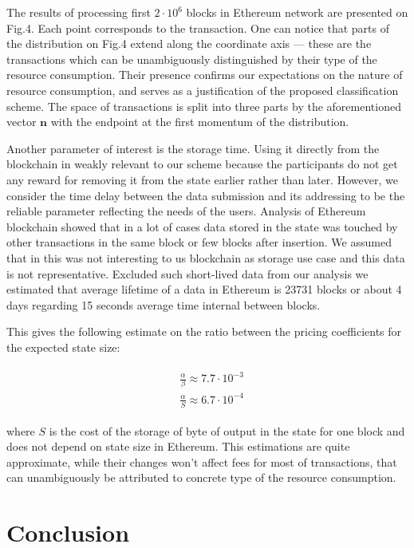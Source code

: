 \documentclass[]{llncs}   %
\newcommand{\authnote}[2]{\marginpar{\parbox{\marginparwidth}{\tiny %
  \textsf{#1 {\textcolor{blue}{notes: #2}}}}}%
  \textcolor{blue}{\textbf{\dag}}}
\newcommand{\authnote}[2]{
  \textsf{#1\textcolor{blue}{ #2}}}
\newcommand{\authnote}[2]{}
\newcommand{\dnote}[1]{{\authnote{\textcolor{red}{Dima notes:}}{#1}}}
\begin{document}
\dnote{make letters larger}

The results of processing first $2\cdot10^6$ blocks in Ethereum network are presented on Fig.4. Each point corresponds to the
transaction.  One can notice that parts of the distribution on Fig.4 extend
along the coordinate axis --- these are the transactions which can be
unambiguously distinguished by their type of the resource consumption. Their
presence confirms our expectations on the nature of resource consumption, and
serves as a justification of the proposed classification scheme. The space of
transactions is split into three parts by the aforementioned vector $\mathbf{n}$ \dnote{where was in mentioned?}
with the endpoint at the first momentum of the distribution.

Another parameter of interest is the storage time. Using it directly
from the blockchain in weakly relevant to our scheme because the participants do
not get any reward for removing it from the state earlier rather than later.
However, we consider the time delay between the data submission and its
addressing to be the reliable parameter reflecting the needs of the users.
Analysis of Ethereum blockchain showed that in a lot of cases data stored in the state
was touched by other transactions in the same block or few blocks after insertion.
We assumed that in this was not interesting to us blockchain as storage use case
and this data is not representative. Excluded such short-lived data from our analysis
we estimated that average lifetime of a data in Ethereum is 23731 blocks or about 4 days
regarding 15 seconds average time internal between blocks.

This gives the following estimate on the ratio between the pricing coefficients for the expected state size:

\begin{align}
\begin{split}
&\frac{\alpha}{\beta} \approx 7.7\cdot10^{-3} \\
&\frac{\alpha}{S} \approx 6.7\cdot10^{-4}
\end{split}
\end{align}

where $S$ is the cost of the storage of byte of output in the state for one block and does
not depend on state size in Ethereum. This estimations are quite approximate, while their
changes won't affect fees for most of transactions, that can unambiguously be attributed
to concrete type of the resource consumption.

\section{Conclusion}
\label{sec:conslusion}
\end{document}
